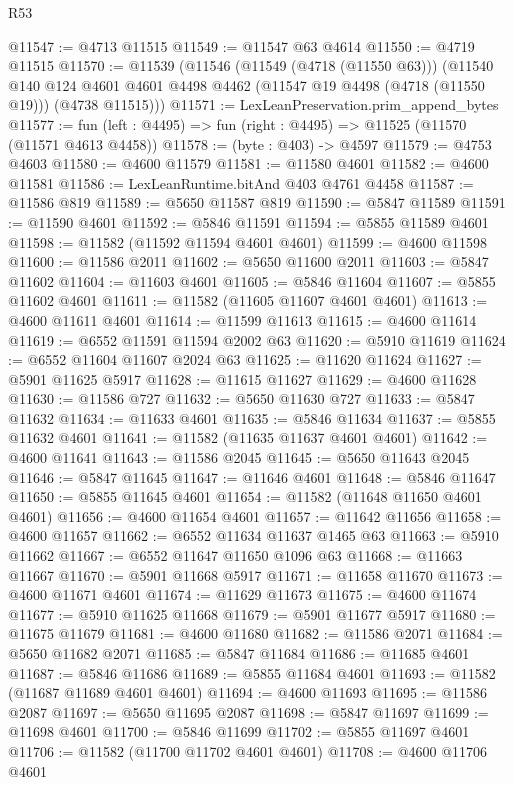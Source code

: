 \begin{lexlean}{R53}
\begin{coremodule}
@11547 := @4713 @11515
@11549 := @11547 @63 @4614
@11550 := @4719 @11515
@11570 := @11539
    (@11546
      (@11549 (@4718 (@11550 @63)))
      (@11540
        @140
        @124
        @4601
        @4601
        @4498
        @4462
        (@11547 @19 @4498 (@4718 (@11550 @19)))
        (@4738 @11515)))
@11571 := LexLeanPreservation.prim_append_bytes
@11577 := fun (left : @4495) => fun (right : @4495) => @11525 (@11570 (@11571 @4613 @4458))
@11578 := (byte : @403) -> @4597
@11579 := @4753 @4603
@11580 := @4600 @11579
@11581 := @11580 @4601
@11582 := @4600 @11581
@11586 := LexLeanRuntime.bitAnd @403 @4761 @4458
@11587 := @11586 @819
@11589 := @5650 @11587 @819
@11590 := @5847 @11589
@11591 := @11590 @4601
@11592 := @5846 @11591
@11594 := @5855 @11589 @4601
@11598 := @11582 (@11592 @11594 @4601 @4601)
@11599 := @4600 @11598
@11600 := @11586 @2011
@11602 := @5650 @11600 @2011
@11603 := @5847 @11602
@11604 := @11603 @4601
@11605 := @5846 @11604
@11607 := @5855 @11602 @4601
@11611 := @11582 (@11605 @11607 @4601 @4601)
@11613 := @4600 @11611 @4601
@11614 := @11599 @11613
@11615 := @4600 @11614
@11619 := @6552 @11591 @11594 @2002 @63
@11620 := @5910 @11619
@11624 := @6552 @11604 @11607 @2024 @63
@11625 := @11620 @11624
@11627 := @5901 @11625 @5917
@11628 := @11615 @11627
@11629 := @4600 @11628
@11630 := @11586 @727
@11632 := @5650 @11630 @727
@11633 := @5847 @11632
@11634 := @11633 @4601
@11635 := @5846 @11634
@11637 := @5855 @11632 @4601
@11641 := @11582 (@11635 @11637 @4601 @4601)
@11642 := @4600 @11641
@11643 := @11586 @2045
@11645 := @5650 @11643 @2045
@11646 := @5847 @11645
@11647 := @11646 @4601
@11648 := @5846 @11647
@11650 := @5855 @11645 @4601
@11654 := @11582 (@11648 @11650 @4601 @4601)
@11656 := @4600 @11654 @4601
@11657 := @11642 @11656
@11658 := @4600 @11657
@11662 := @6552 @11634 @11637 @1465 @63
@11663 := @5910 @11662
@11667 := @6552 @11647 @11650 @1096 @63
@11668 := @11663 @11667
@11670 := @5901 @11668 @5917
@11671 := @11658 @11670
@11673 := @4600 @11671 @4601
@11674 := @11629 @11673
@11675 := @4600 @11674
@11677 := @5910 @11625 @11668
@11679 := @5901 @11677 @5917
@11680 := @11675 @11679
@11681 := @4600 @11680
@11682 := @11586 @2071
@11684 := @5650 @11682 @2071
@11685 := @5847 @11684
@11686 := @11685 @4601
@11687 := @5846 @11686
@11689 := @5855 @11684 @4601
@11693 := @11582 (@11687 @11689 @4601 @4601)
@11694 := @4600 @11693
@11695 := @11586 @2087
@11697 := @5650 @11695 @2087
@11698 := @5847 @11697
@11699 := @11698 @4601
@11700 := @5846 @11699
@11702 := @5855 @11697 @4601
@11706 := @11582 (@11700 @11702 @4601 @4601)
@11708 := @4600 @11706 @4601

\end{coremodule}
\end{lexlean}
